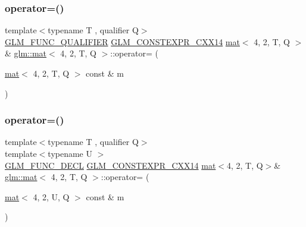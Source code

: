 \subsubsection{\texorpdfstring{operator=()}{operator=()}\hspace{0.1cm}{\footnotesize\ttfamily [1/3]}}
{\footnotesize\ttfamily template$<$typename T , qualifier Q$>$ \\
\hyperlink{setup_8hpp_a33fdea6f91c5f834105f7415e2a64407}{G\+L\+M\+\_\+\+F\+U\+N\+C\+\_\+\+Q\+U\+A\+L\+I\+F\+I\+ER} \hyperlink{setup_8hpp_a4dd12abf5e1164bc57f3a34671d03844}{G\+L\+M\+\_\+\+C\+O\+N\+S\+T\+E\+X\+P\+R\+\_\+\+C\+X\+X14} \hyperlink{structglm_1_1mat}{mat}$<$ 4, 2, T, Q $>$ \& \hyperlink{structglm_1_1mat}{glm\+::mat}$<$ 4, 2, T, Q $>$\+::operator= (\begin{DoxyParamCaption}\item[{\hyperlink{structglm_1_1mat}{mat}$<$ 4, 2, T, Q $>$ const \&}]{m }\end{DoxyParamCaption})}

\mbox{\label{structglm_1_1mat_3_014_00_012_00_01_t_00_01_q_01_4_a40494ccea0b2ac5816c33779b9e25d74}} 
\subsubsection{\texorpdfstring{operator=()}{operator=()}\hspace{0.1cm}{\footnotesize\ttfamily [2/3]}}
{\footnotesize\ttfamily template$<$typename T , qualifier Q$>$ \\
template$<$typename U $>$ \\
\hyperlink{setup_8hpp_ab2d052de21a70539923e9bcbf6e83a51}{G\+L\+M\+\_\+\+F\+U\+N\+C\+\_\+\+D\+E\+CL} \hyperlink{setup_8hpp_a4dd12abf5e1164bc57f3a34671d03844}{G\+L\+M\+\_\+\+C\+O\+N\+S\+T\+E\+X\+P\+R\+\_\+\+C\+X\+X14} \hyperlink{structglm_1_1mat}{mat}$<$4, 2, T, Q$>$\& \hyperlink{structglm_1_1mat}{glm\+::mat}$<$ 4, 2, T, Q $>$\+::operator= (\begin{DoxyParamCaption}\item[{\hyperlink{structglm_1_1mat}{mat}$<$ 4, 2, U, Q $>$ const \&}]{m }\end{DoxyParamCaption})}

\mbox{\label{structglm_1_1mat_3_014_00_012_00_01_t_00_01_q_01_4_a5a19a58d4bc0772518b210e63aa86e7f}} 
